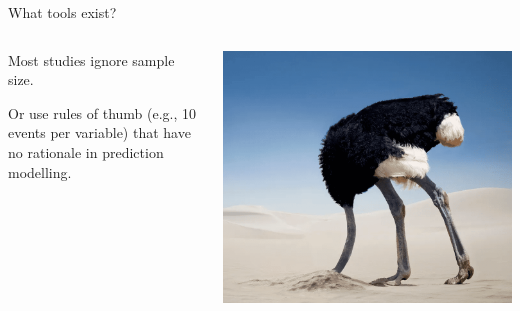 \documentclass[11pt]{beamer}
\newcommand{\bgap}{\vspace{0.8em}}
\begin{document}
\begin{frame}[t]{What tools exist?}

	\centering
	\begin{columns}
		\begin{column}[c]{0.6\textwidth}
			\centering
			Most studies ignore sample size.
			\bgap%

			Or use rules of thumb (e.g., 10 events per variable) that have no
			rationale in prediction modelling\autocite{vansmeden2016}.
		\end{column}
		\begin{column}[c]{0.4\textwidth}
			\includegraphics[width=\textwidth]{figures/bury-head.png}%
		\end{column}
	\end{columns}

    \bgap


\end{frame}
\end{document}
